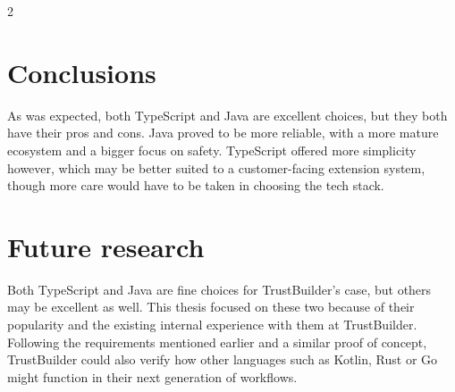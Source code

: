 \documentclass[a0,portrait,english]{hogent-poster}
\begin{document}
\begin{multicols}{2}
\section{Conclusions}


As was expected, both TypeScript and Java are excellent choices, but they both have their pros and cons. Java proved to be more reliable, with a more mature ecosystem and a bigger focus on safety. TypeScript offered more simplicity however, which may be better suited to a customer-facing extension system, though more care would have to be taken in choosing the tech stack.

\section{Future research}

Both TypeScript and Java are fine choices for TrustBuilder’s case, but others may be excellent as well. This thesis focused on these two because of their popularity and the existing internal experience with them at TrustBuilder. Following the requirements mentioned earlier and a similar proof of concept, TrustBuilder could also verify how other languages such as Kotlin, Rust or Go might function in their next generation of workflows.

\end{multicols}
\end{document}
